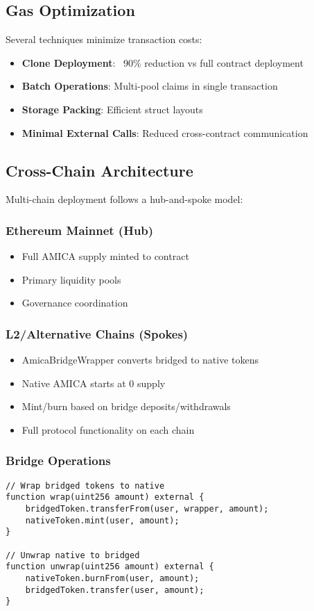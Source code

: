 \documentclass{article}
\begin{document}
\subsection{Gas Optimization}

Several techniques minimize transaction costs:

\begin{itemize}
    \item \textbf{Clone Deployment}: ~90\% reduction vs full contract deployment
    \item \textbf{Batch Operations}: Multi-pool claims in single transaction
    \item \textbf{Storage Packing}: Efficient struct layouts
    \item \textbf{Minimal External Calls}: Reduced cross-contract communication
\end{itemize}

\subsection{Cross-Chain Architecture}

Multi-chain deployment follows a hub-and-spoke model:

\subsubsection{Ethereum Mainnet (Hub)}
\begin{itemize}
    \item Full AMICA supply minted to contract
    \item Primary liquidity pools
    \item Governance coordination
\end{itemize}

\subsubsection{L2/Alternative Chains (Spokes)}
\begin{itemize}
    \item AmicaBridgeWrapper converts bridged to native tokens
    \item Native AMICA starts at 0 supply
    \item Mint/burn based on bridge deposits/withdrawals
    \item Full protocol functionality on each chain
\end{itemize}

\subsubsection{Bridge Operations}
\begin{verbatim}
// Wrap bridged tokens to native
function wrap(uint256 amount) external {
    bridgedToken.transferFrom(user, wrapper, amount);
    nativeToken.mint(user, amount);
}

// Unwrap native to bridged
function unwrap(uint256 amount) external {
    nativeToken.burnFrom(user, amount);
    bridgedToken.transfer(user, amount);
}
\end{verbatim}
\end{document}
